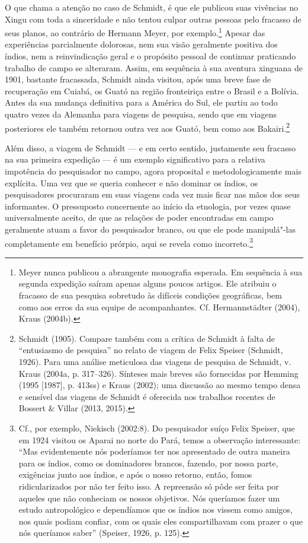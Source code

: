 O que chama a atenção no caso de Schmidt, é que ele publicou suas
vivências no Xingu com toda a sinceridade e não tentou culpar outras
pessoas pelo fracasso de seus planos, ao contrário de Hermann Meyer, por
exemplo.\footnote{Meyer nunca publicou a abrangente monografia esperada.
  Em sequência à sua segunda expedição saíram apenas alguns poucos
  artigos. Ele atribuiu o fracasso de sua pesquisa sobretudo às
  difíceis condições geográficas, bem como aos erros da sua equipe de
  acompanhantes. Cf. Hermannstädter (2004), Kraus (2004b).} Apesar das
experiências parcialmente dolorosas, nem sua visão geralmente positiva
dos índios, nem a reinvindicação geral e o propósito pessoal de
continuar praticando trabalho de campo se alteraram. Assim, em
sequência à sua aventura xinguana de 1901, bastante fracassada, Schmidt
ainda visitou, após uma breve fase de recuperação em Cuiabá, os Guató na
região fronteiriça entre o Brasil e a Bolívia. Antes da sua mudança
definitiva para a América do Sul, ele partiu ao todo quatro vezes da
Alemanha para viagens de pesquisa, sendo que em viagens posteriores ele
também retornou outra vez aos Guató, bem como aos Bakairi.\footnote{Schmidt
  (1905). Compare também com a crítica de Schmidt à falta de
  ``entusiasmo de pesquisa'' no relato de viagem de Felix Speiser
  (Schmidt, 1926). Para uma análise meticulosa das viagens de pesquisa
  de Schmidt, v. Kraus (2004a, p. 317--326). Sínteses mais breves são
  fornecidas por Hemming (1995 {[}1987{]}, p. 413ss) e Kraus (2002); uma
  discussão ao mesmo tempo densa e sensível das viagens de Schmidt é
  oferecida nos trabalhos recentes de Bossert \& Villar (2013, 2015).}

Além disso, a viagem de Schmidt --- e em certo sentido, justamente seu
fracasso na sua primeira expedição --- é um exemplo significativo para a
relativa impotência do pesquisador no campo, agora proposital e
metodologicamente mais explícita. Uma vez que se queria conhecer e não
dominar os índios, os pesquisadores procuraram em suas viagens cada vez
mais ficar nas mãos dos seus informantes. O pressuposto concernente ao
início da etnologia, por vezes quase universalmente aceito, de que as
relações de poder encontradas em campo geralmente atuam a favor do
pesquisador branco, ou que ele pode manipulá"-las completamente em
benefício prórpio, aqui se revela como incorreto.\footnote{Cf., por
  exemplo, Niekisch (2002:8). Do pesquisador suíço Felix Speiser, que em
  1924 visitou os Aparai no norte do Pará, temos a observação
  interessante: ``Mas evidentemente nós poderíamos ter nos apresentado
  de outra maneira para os índios, como os dominadores brancos, fazendo,
  por nossa parte, exigências junto aos índios, e após o nosso retorno,
  então, fomos ridicularizados por não ter feito isso. A repreensão só
  pôde ser feita por aqueles que não conheciam os nossos objetivos. Nós
  queríamos fazer um estudo antropológico e dependíamos que os índios
  nos vissem como amigos, nos quais podiam confiar, com os quais eles
  compartilhavam com prazer o que nós queríamos saber'' (Speiser, 1926,
  p. 125).}

